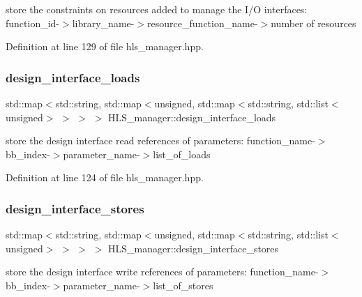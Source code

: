 store the constraints on resources added to manage the I/O interfaces\+: function\+\_\+id-\/$>$library\+\_\+name-\/$>$resource\+\_\+function\+\_\+name-\/$>$number of resources 



Definition at line 129 of file hls\+\_\+manager.\+hpp.

\mbox{\label{classHLS__manager_a17a38a245c68dd49cc486c7b63863d9c}} 
\subsubsection{\texorpdfstring{design\+\_\+interface\+\_\+loads}{design\_interface\_loads}}
{\footnotesize\ttfamily std\+::map$<$std\+::string, std\+::map$<$unsigned, std\+::map$<$std\+::string, std\+::list$<$unsigned$>$ $>$ $>$ $>$ H\+L\+S\+\_\+manager\+::design\+\_\+interface\+\_\+loads}



store the design interface read references of parameters\+: function\+\_\+name-\/$>$bb\+\_\+index-\/$>$parameter\+\_\+name-\/$>$list\+\_\+of\+\_\+loads 



Definition at line 124 of file hls\+\_\+manager.\+hpp.

\mbox{\label{classHLS__manager_a0fa12a49e2a498dfd7cd08a581e3727d}} 
\subsubsection{\texorpdfstring{design\+\_\+interface\+\_\+stores}{design\_interface\_stores}}
{\footnotesize\ttfamily std\+::map$<$std\+::string, std\+::map$<$unsigned, std\+::map$<$std\+::string, std\+::list$<$unsigned$>$ $>$ $>$ $>$ H\+L\+S\+\_\+manager\+::design\+\_\+interface\+\_\+stores}



store the design interface write references of parameters\+: function\+\_\+name-\/$>$bb\+\_\+index-\/$>$parameter\+\_\+name-\/$>$list\+\_\+of\+\_\+stores 



